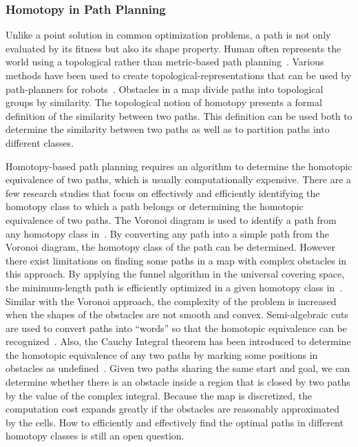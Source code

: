 \documentclass[phd]{byuprop}
\begin{document}
\subsubsection{Homotopy in Path Planning}
\label{sec:related_work:algorithm_specific_work:homotopy_in_path_planning}


Unlike a point solution in common optimization problems, a path is not only evaluated by its fitness but also its shape property.
Human often represents the world using a topological rather than metric-based path planning~\cite{Aginsky1997,kuipers1999}. 
Various methods have been used to create topological-representations that can be used by path-planners for robots~\cite{Mataric1992,Thrun1998,Fasola2013,Shah2013}.
Obstacles in a map divide paths into topological groups by similarity. 
The topological notion of homotopy presents a formal definition of the similarity between two paths. 
This definition can be used both to determine the similarity between two paths as well as to partition paths into different classes.

Homotopy-based path planning requires an algorithm to determine the homotopic equivalence of two paths, which is usually computationally expensive. 
There are a few research studies that focus on effectively and efficiently identifying the homotopy class to which a path belongs or determining the homotopic equivalence of two paths. 
The Voronoi diagram is used to identify a path from any homotopy class in~\cite{Banerjee2013}. 
By converting any path into a simple path from the Voronoi diagram, the homotopy class of the path can be determined. 
However there exist limitations on finding some paths in a map with complex obstacles in this approach.
By applying the funnel algorithm in the universal covering space, the minimum-length path is efficiently optimized in a given homotopy class in~\cite{Hershberger1994}. 
Similar with the Voronoi approach, the complexity of the problem is increased when the shapes of the obstacles are not smooth and convex. 
Semi-algebraic cuts are used to convert paths into “words” so that the homotopic equivalence can be recognized~\cite{Grigoriev1998}. 
Also, the Cauchy Integral theorem has been introduced to determine the homotopic equivalence of any two paths by marking some positions in obstacles as undefined~\cite{Bhattachary2010}. 
Given two paths sharing the same start and goal, we can determine whether there is an obstacle inside a region that is closed by two paths by the value of the complex integral. 
Because the map is discretized, the computation cost expands greatly if the obstacles are reasonably approximated by the cells.
How to efficiently and effectively find the optimal paths in different homotopy classes is still an open question.
\end{document}
